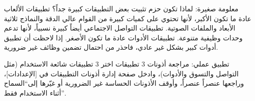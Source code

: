 \begin{tcbinfo}{معلومة صغيرة: لماذا تكون حزم تثبيت بعض التطبيقات كبيرة جداً؟}
تطبيقات الألعاب عادة ما تكون الأكبر، لأنها تحتوي على كميات كبيرة من القوام عالي الدقة والنماذج ثلاثية الأبعاد والملفات الصوتية. تطبيقات التواصل الاجتماعي أيضاً كبيرة نسبياً، لأنها تدعم وحدات وظيفية متنوعة. تطبيقات الأدوات عادة ما تكون الأصغر. إذا لاحظت أن تطبيق أدوات كبير بشكل غير عادي، فاحذر من احتمال تضمين وظائف غير ضرورية.

\end{tcbinfo}

\begin{tcbpractice}{تطبيق عملي: مراجعة أذونات 3 تطبيقات}
اختر 3 تطبيقات شائعة الاستخدام (مثل التواصل والتسوق والأدوات)، وادخل صفحة إدارة أذونات التطبيقات في [الإعدادات]، وراجعها عنصراً عنصراً، وأوقف الأذونات الحساسة غير الضرورية أو غيّرها إلى“السماح أثناء الاستخدام فقط”.

\end{tcbpractice}
